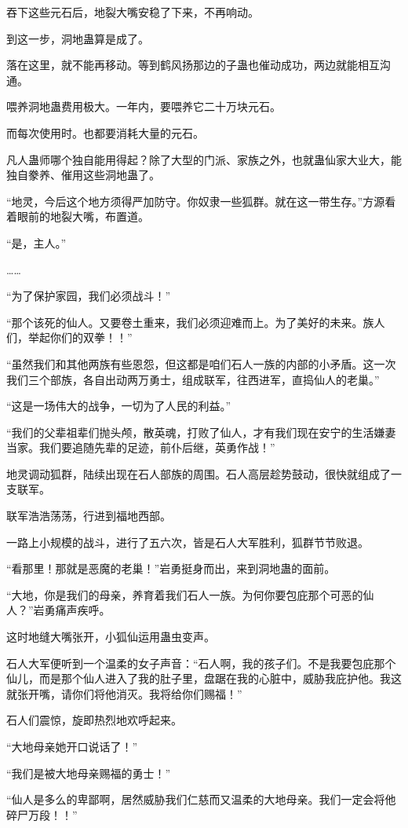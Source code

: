 \begin{this_body}
吞下这些元石后，地裂大嘴安稳了下来，不再响动。

到这一步，洞地蛊算是成了。

落在这里，就不能再移动。等到鹤风扬那边的子蛊也催动成功，两边就能相互沟通。

喂养洞地蛊费用极大。一年内，要喂养它二十万块元石。

而每次使用时。也都要消耗大量的元石。

凡人蛊师哪个独自能用得起？除了大型的门派、家族之外，也就蛊仙家大业大，能独自豢养、催用这些洞地蛊了。

“地灵，今后这个地方须得严加防守。你奴隶一些狐群。就在这一带生存。”方源看着眼前的地裂大嘴，布置道。

“是，主人。”

……

“为了保护家园，我们必须战斗！”

“那个该死的仙人。又要卷土重来，我们必须迎难而上。为了美好的未来。族人们，举起你们的双拳！！”

“虽然我们和其他两族有些恩怨，但这都是咱们石人一族的内部的小矛盾。这一次我们三个部族，各自出动两万勇士，组成联军，往西进军，直捣仙人的老巢。”

“这是一场伟大的战争，一切为了人民的利益。”

“我们的父辈祖辈们抛头颅，散英魂，打败了仙人，才有我们现在安宁的生活嫌妻当家。我们要追随先辈的足迹，前仆后继，英勇作战！”

地灵调动狐群，陆续出现在石人部族的周围。石人高层趁势鼓动，很快就组成了一支联军。

联军浩浩荡荡，行进到福地西部。

一路上小规模的战斗，进行了五六次，皆是石人大军胜利，狐群节节败退。

“看那里！那就是恶魔的老巢！”岩勇挺身而出，来到洞地蛊的面前。

“大地，你是我们的母亲，养育着我们石人一族。为何你要包庇那个可恶的仙人？”岩勇痛声疾呼。

这时地缝大嘴张开，小狐仙运用蛊虫变声。

石人大军便听到一个温柔的女子声音：“石人啊，我的孩子们。不是我要包庇那个仙儿，而是那个仙人进入了我的肚子里，盘踞在我的心脏中，威胁我庇护他。我这就张开嘴，请你们将他消灭。我将给你们赐福！”

石人们震惊，旋即热烈地欢呼起来。

“大地母亲她开口说话了！”

“我们是被大地母亲赐福的勇士！”

“仙人是多么的卑鄙啊，居然威胁我们仁慈而又温柔的大地母亲。我们一定会将他碎尸万段！！”


\end{this_body}
